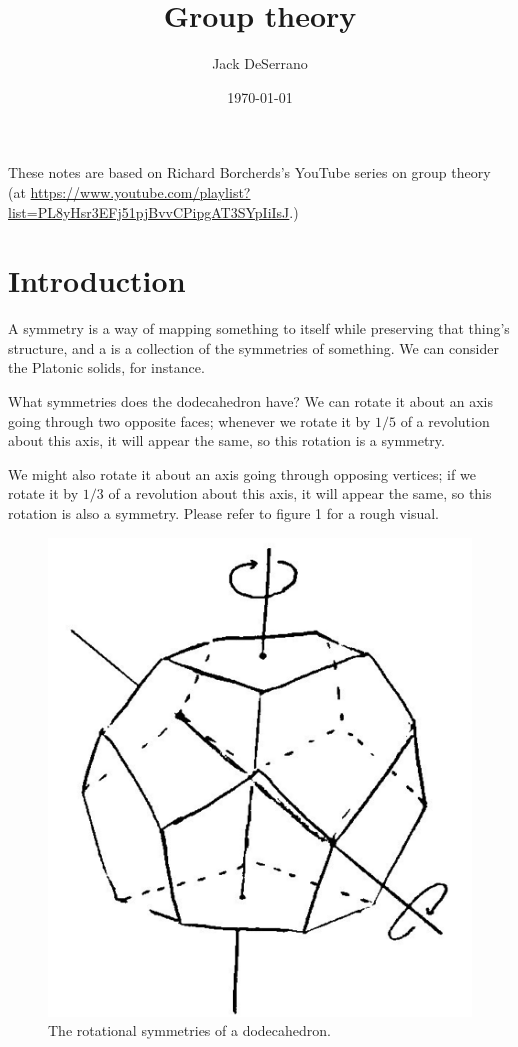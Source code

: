\documentclass[11pt, twoside]{amsart}
\title{Group theory}
\author{Jack DeSerrano}
\date{\today}
\begin{document}
\maketitle
These notes are based on Richard Borcherds's YouTube series on group theory (at \url{https://www.youtube.com/playlist?list=PL8yHsr3EFj51pjBvvCPipgAT3SYpIiIsJ}.)

\tableofcontents
\newpage

\section{Introduction}
A symmetry is a way of mapping something to itself while preserving that thing's structure, and a  is a collection of the symmetries of something. We can consider the Platonic solids, for instance. 

What symmetries does the dodecahedron have? We can rotate it about an axis going through two opposite faces; whenever we rotate it by $1/5$ of a revolution about this axis, it will appear the same, so this rotation is a symmetry. 

We might also rotate it about an axis going through opposing vertices; if we rotate it by $1/3$ of a revolution about this axis, it will appear the same, so this rotation is also a symmetry. Please refer to figure 1 for a rough visual.
\begin{figure}
\centering
\includegraphics[scale=0.4]{images/dodecahedron}
\caption{The rotational symmetries of a dodecahedron.}
\end{figure}
\end{document}
